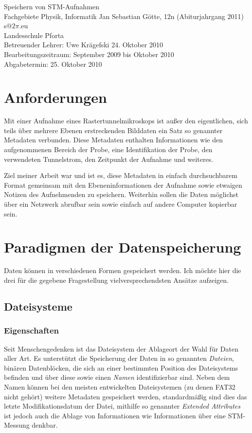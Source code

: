 \documentclass[12pt,ngerman,a4]{scrartcl}
\begin{document}

\vspace*{3cm}
Speichern von STM-Aufnahmen\\
\vspace*{1cm}
\large Fachgebiete Physik, Informatik
Jan Sebastian Götte, 12n (Abiturjahrgang 2011)\\
s@$2\pi$.eu\\
Landesschule Pforta\\
Betreuender Lehrer: Uwe Krägefski
24. Oktober 2010\\
Bearbeitungszeitraum: September 2009 bis Oktober 2010\\
Abgabetermin: 25. Oktober 2010

\thispagestyle{empty}
\newpage
\tableofcontents
\pagestyle{scrheadings}
\newpage
\section{Anforderungen}
Mit einer Aufnahme eines Rastertunnelmikroskops ist außer den eigentlichen, sich teils über mehrere Ebenen erstreckenden Bilddaten ein Satz so genannter Metadaten verbunden. Diese Metadaten enthalten Informationen wie den aufgenommenen Bereich der Probe, eine Identifikation der Probe, den verwendeten Tunnelstrom, den Zeitpunkt der Aufnahme und weiteres.

Ziel meiner Arbeit war und ist es, diese Metadaten in einfach durchsuchbarem Format gemeinsam mit den Ebeneninformationen der Aufnahme sowie etwaigen Notizen des Aufnehmenden zu speichern. Weiterhin sollen die Daten möglichst über ein Netzwerk abrufbar sein sowie einfach auf andere Computer kopierbar sein.

\section{Paradigmen der Datenspeicherung}
Daten können in verschiedenen Formen gespeichert werden. Ich möchte hier die drei für die gegebene Fragestellung vielversprechendsten Ansätze aufzeigen.
\subsection{Dateisysteme}
\subsubsection{Eigenschaften}
Seit Menschengedenken ist das Dateisystem der Ablageort der Wahl für Daten aller Art. Es unterstützt die Speicherung der Daten in so genannten \emph{Dateien}, binären Datenblöcken, die sich an einer bestimmten Position des Dateisystems befinden und über diese sowie einen \emph{Namen} identifizierbar sind. Neben dem Namen können bei den meisten entwickelten Dateisystemen (zu denen FAT32 nicht gehört) weitere Metadaten gespeichert werden, standardmäßig sind dies das letzte Modifikationsdatum der Datei, mithilfe so genannter \emph{Extended Attributes} ist jedoch auch die Ablage von Informationen wie Informationen über eine STM-Messung denkbar.
\end{document}
